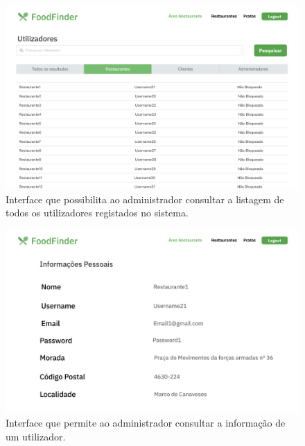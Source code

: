 \documentclass[a4paper,12pt]{report}
\begin{document}
	\begin{figure}[H]
	\begin{center}
	\includegraphics[scale=0.25]{18.1-Gerir_Utilizadores_Administrador_1}	
	\end{center}
	\caption{Interface que possibilita ao administrador consultar a listagem de todos os utilizadores registados no sistema.}
	\end{figure} 
	
	
	\begin{figure}[H]
	\begin{center}
	\includegraphics[scale=0.25]{20.1-Gerir_Utilizadores_restaurante_Administrador_1}	
	\end{center}
	\caption{Interface que permite ao administrador consultar a informação de um utilizador.}
	\end{figure} 
	
\end{document}
